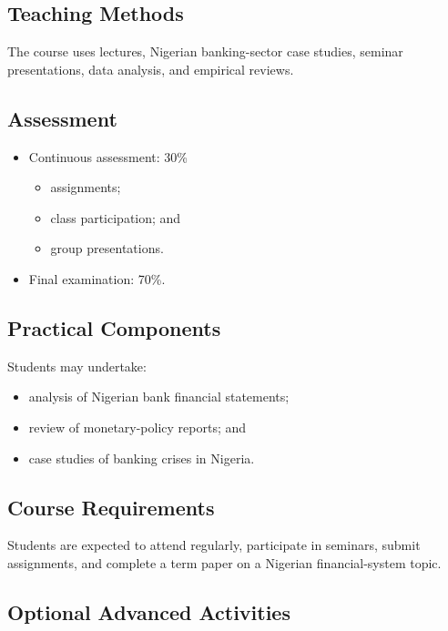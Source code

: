 \documentclass[
]{article}
\providecommand{\tightlist}{%
  \setlength{\itemsep}{0pt}\setlength{\parskip}{0pt}}
\begin{document}
\subsection{Teaching Methods}\label{teaching-methods}

The course uses lectures, Nigerian banking-sector case studies, seminar presentations, data analysis, and empirical reviews.

\subsection{Assessment}\label{assessment}

\begin{itemize}
\tightlist
\item
  Continuous assessment: 30\%

  \begin{itemize}
  \tightlist
  \item
    assignments;
  \item
    class participation; and
  \item
    group presentations.
  \end{itemize}
\item
  Final examination: 70\%.
\end{itemize}

\subsection{Practical Components}\label{practical-components}

Students may undertake:

\begin{itemize}
\tightlist
\item
  analysis of Nigerian bank financial statements;
\item
  review of monetary-policy reports; and
\item
  case studies of banking crises in Nigeria.
\end{itemize}

\subsection{Course Requirements}\label{course-requirements}

Students are expected to attend regularly, participate in seminars, submit assignments, and complete a term paper on a Nigerian financial-system topic.

\subsection{Optional Advanced Activities}\label{optional-advanced-activities}
\end{document}
